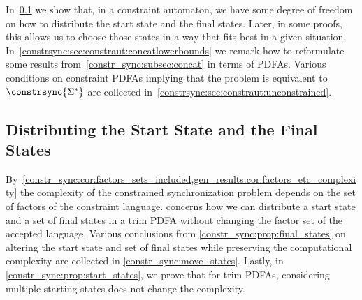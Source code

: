 

In~\cref{constrsync:sec:constraut:startfinal} we show that, in a constraint automaton, 
we have some degree of freedom on how to distribute the start state and the final states. 
Later, in some proofs, this allows us to choose those states 
in a way that fits best in a given situation.
In~\cref{constrsync:sec:constraut:concatlowerbounds} 
we remark how to reformulate some results from~\cref{constr_sync:subsec:concat} 
in terms of PDFAs.
Various conditions on constraint PDFAs implying
that the problem is equivalent to $\constrsync{\Sigma^*}$
are collected in~\cref{constrsync:sec:constraut:unconstrained}. 


\subsection{Distributing the Start State and the Final States}
\label{constrsync:sec:constraut:startfinal}


By~\cref{constr_sync:cor:factors_sets_included,gen_results:cor:factors_etc_complexity} the complexity
of the constrained synchronization problem depends on the set of factors of the constraint 
language. 
concerns how we can distribute a start state and a set
of final states in a trim PDFA without changing the factor set of the accepted language.
Various conclusions from \cref{constr_sync:prop:final_states} 
on altering the start state and set of final states
while preserving the computational complexity are collected in \cref{constr_sync:move_states}.
Lastly, in \cref{constr_sync:prop:start_states}, 
we prove that for trim PDFAs, considering multiple starting
states does not change the complexity.


